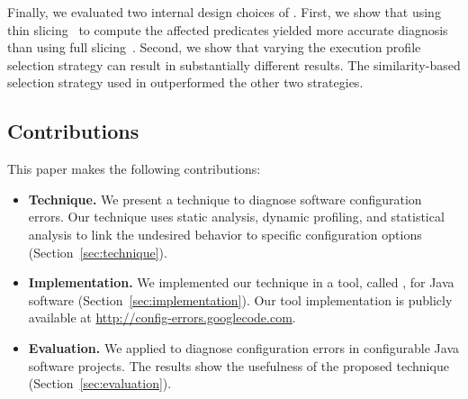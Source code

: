 Finally, we evaluated two internal design choices of \ourtool.
First, we show that using thin slicing~\cite{Sridharan:2007} to compute the affected
predicates yielded more accurate diagnosis than using full slicing~\cite{Horwitz:1988}.
Second, we %
show that varying the execution
profile selection strategy can result in substantially different
results. %
The similarity-based selection strategy used in \ourtool outperformed
the other two strategies.








\subsection{Contributions}
This paper makes the following contributions:

\begin{itemize}

\item \textbf{Technique.} We present a technique to diagnose
software configuration errors. Our technique uses static analysis,
dynamic profiling, and statistical analysis to link the
undesired behavior to specific configuration options (Section~\ref{sec:technique}).


\item \textbf{Implementation.} We implemented our technique 
in a tool, called \ourtool, for Java software (Section~\ref{sec:implementation}). Our tool implementation is publicly available at
\url{http://config-errors.googlecode.com}. 


\item \textbf{Evaluation.} We applied \ourtool to diagnose
\errors configuration errors in \subjectnum
configurable Java software projects. The results
show the usefulness of the proposed technique (Section~\ref{sec:evaluation}).

\end{itemize}



